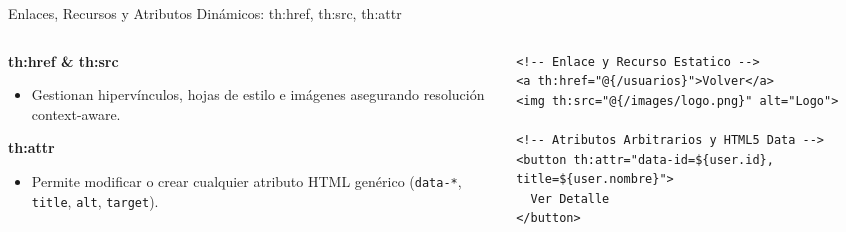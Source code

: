 \documentclass[aspectratio=169]{beamer}
\begin{document}
\begin{frame}[fragile]{Enlaces, Recursos y Atributos Din\'amicos: th:href, th:src, th:attr}
\begin{columns}[T]
\begin{column}{0.48\textwidth}
  \textbf{th:href \& th:src}
  \begin{itemize}
    \item Gestionan hiperv\'inculos, hojas de estilo e im\'agenes asegurando resoluci\'on context-aware.
  \end{itemize}
  \vspace{4pt}
  \textbf{th:attr}
  \begin{itemize}
    \item Permite modificar o crear cualquier atributo HTML gen\'erico (\texttt{data-*}, \texttt{title}, \texttt{alt}, \texttt{target}).
  \end{itemize}
\end{column}
\begin{column}{0.50\textwidth}
\begin{lstlisting}[style=ThymeleafStyle]
<!-- Enlace y Recurso Estatico -->
<a th:href="@{/usuarios}">Volver</a>
<img th:src="@{/images/logo.png}" alt="Logo">

<!-- Atributos Arbitrarios y HTML5 Data -->
<button th:attr="data-id=${user.id}, title=${user.nombre}">
  Ver Detalle
</button>
\end{lstlisting}
\end{column}
\end{columns}
\end{frame}
\end{document}
